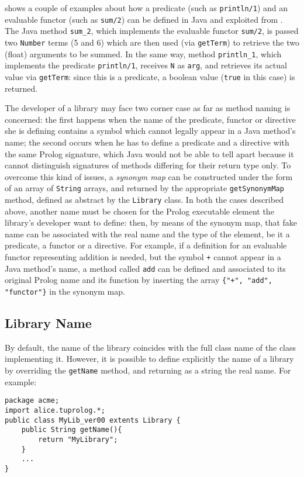  shows a couple of examples about how a predicate
(such as \texttt{println/1}) and an evaluable functor (such as
\texttt{sum/2}) can be defined in Java and exploited from
\tuprolog{}.
%
The Java method \texttt{sum\_2}, which implements the evaluable
functor \texttt{sum/2}, is passed two \texttt{Number} terms (5 and 6)
which are then used (via \texttt{getTerm}) to retrieve the two
(float) arguments to be summed.
%
In the same way, method \texttt{println\_1}, which implements the
predicate \texttt{println/1}, receives \texttt{N} as \texttt{arg},
and retrieves its actual value via \texttt{getTerm}: since this is
a predicate, a boolean value (\texttt{true} in this case) is returned.
%

The developer of a library may face two corner case as far as method
naming is concerned: the first happens when the name of the
predicate, functor or directive she is defining contains a symbol
which cannot legally appear in a Java method's name; the second
occurs when he has to define a predicate and a directive with the
same Prolog signature, which Java would not be able to tell apart
because it cannot distinguish signatures of methods differing for
their return type only.
%
To overcome this kind of issues, a {\em synonym map} can be
constructed under the form of an array of \texttt{String} arrays,
and returned by the appropriate \texttt{getSynonymMap} method,
defined as abstract by the \texttt{Library} class. In both the cases
described above, another name must be chosen for the Prolog
executable element the library's developer want to define: then, by
means of the synonym map, that fake name can be associated with the
real name and the type of the element, be it a predicate, a functor
or a directive.
%
For example, if a definition for an evaluable functor representing
addition is needed, but the symbol \texttt{+} cannot appear in a
Java method's name, a method called \texttt{add} can be defined and
associated to its original Prolog name and its function by inserting
the array \texttt{\{"+", "add", "functor"\}} in the synonym map.

\subsection{Library Name}

%
By default, the name of the library coincides with the full class name of the
class implementing it.
%
However, it is possible to define explicitly the name of a library by
overriding the \texttt{getName} method, and returning as a string
the real name.
%
For example:
%
\begin{verbatim}
package acme;
import alice.tuprolog.*;
public class MyLib_ver00 extents Library {
    public String getName(){
        return "MyLibrary";
    }
    ...
}
\end{verbatim}

